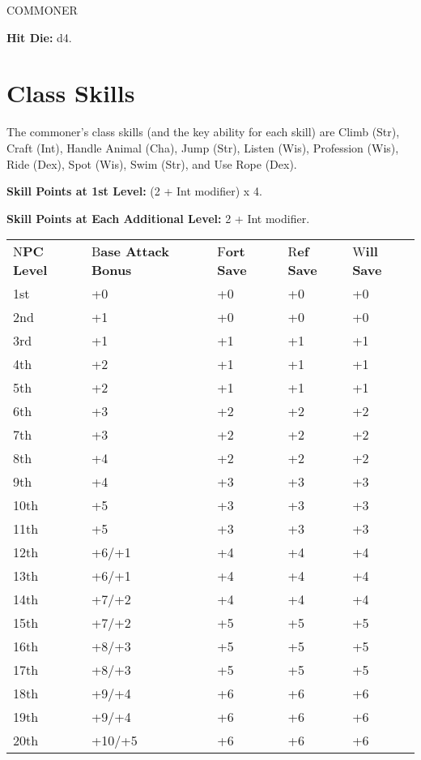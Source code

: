 \documentclass{article}
\begin{document}
{\vspace{12pt}
COMMONER

\textbf{Hit Die:} d4.

\section*{\textbf{Class Skills}}

The commoner's class skills (and the key ability for each skill) are Climb (Str), 
Craft (Int), Handle Animal (Cha), Jump (Str), Listen (Wis), Profession (Wis), Ride 
(Dex), Spot (Wis), Swim (Str), and Use Rope (Dex).

\textbf{Skill Points at 1st Level:} (2 + Int modifier) x $ $4.

\textbf{Skill Points at Each Additional Level:} 2 + Int modifier.

\vspace{12pt}
\begin{tabular}{|>{\raggedright}p{49pt}|>{\raggedright}p{55pt}|>{\raggedright}p{23pt}|>{\raggedright}p{23pt}|>{\raggedright}p{23pt}|}
\hline
\multicolumn{5}{|p{175pt}|}{\section*{T\textbf{able: The Commoner}}}\tabularnewline
\hline
N\textbf{PC Level} & B\textbf{ase Attack}\linebreak{}
\textbf{Bonus} & F\textbf{ort}\linebreak{}
\textbf{Save} & R\textbf{ef}\linebreak{}
\textbf{Save} & W\textbf{ill}\linebreak{}
\textbf{Save}\tabularnewline
\hline
1st & +0 & +0 & +0 & +0\tabularnewline
\hline
2nd & +1 & +0 & +0 & +0\tabularnewline
\hline
3rd & +1 & +1 & +1 & +1\tabularnewline
\hline
4th & +2 & +1 & +1 & +1\tabularnewline
\hline
5th & +2 & +1 & +1 & +1\tabularnewline
\hline
6th & +3 & +2 & +2 & +2\tabularnewline
\hline
7th & +3 & +2 & +2 & +2\tabularnewline
\hline
8th & +4 & +2 & +2 & +2\tabularnewline
\hline
9th & +4 & +3 & +3 & +3\tabularnewline
\hline
10th & +5 & +3 & +3 & +3\tabularnewline
\hline
11th & +5 & +3 & +3 & +3\tabularnewline
\hline
12th & +6/+1 & +4 & +4 & +4\tabularnewline
\hline
13th & +6/+1 & +4 & +4 & +4\tabularnewline
\hline
14th & +7/+2 & +4 & +4 & +4\tabularnewline
\hline
15th & +7/+2 & +5 & +5 & +5\tabularnewline
\hline
16th & +8/+3 & +5 & +5 & +5\tabularnewline
\hline
17th & +8/+3 & +5 & +5 & +5\tabularnewline
\hline
18th & +9/+4 & +6 & +6 & +6\tabularnewline
\hline
19th & +9/+4 & +6 & +6 & +6\tabularnewline
\hline
20th & +10/+5 & +6 & +6 & +6\tabularnewline
\hline
\end{tabular}

}
\end{document}
